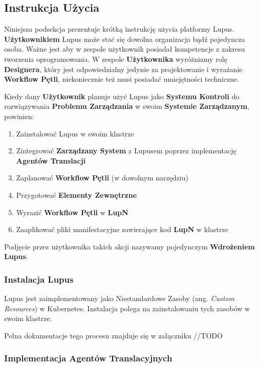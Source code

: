 \subsection{Instrukcja Użycia}

Niniejsza podsekcja prezentuje krótką instrukcję użycia platformy Lupus. \textbf{Użytkownikiem} Lupus może stać się dowolna organizacja bądź pojedyncza osoba. Ważne jest aby w zespole użytkownik posiadał kompetencje z zakresu tworzenia oprogramowania. W zespole \textbf{Użytkownika} wyróżniamy rolę \textbf{Designera}, który jest odpowiedzialny jedynie za projektowanie i wyrażanie \textbf{Workflow Pętli}, niekoniecznie też musi posiadać umiejętności techniczne. 

Kiedy dany \textbf{Użytkownik} planuje użyć Lupus jako \textbf{Systemu Kontroli} do rozwiązywania \textbf{Problemu Zarządzania} w swoim \textbf{Systemie Zarządzanym}, powinien:
\begin{enumerate}
    \item Zainstalować Lupus w swoim klastrze
    \item Zintegrować \textbf{Zarządzany System} z Lupusem poprzez implementację \textbf{Agentów Translacji}
    \item Zaplanować \textbf{Workflow Pętli} (w dowolnym narzędziu)
    \item Przygotować \textbf{Elementy Zewnętrzne} 
    \item Wyrazić \textbf{Workflow Pętli} w \textbf{LupN} 
    \item Zaaplikować pliki manifestacyjne zawierające kod \textbf{LupN} w klastrze
\end{enumerate}

Podjęcie przez użytkownika takich akcji nazywamy pojedynczym \textbf{Wdrożeniem Lupus}.

\subsubsection{Instalacja Lupus}

Lupus jest zaimplementowany jako Niestandardowe Zasoby (ang. \textit{Custom Resources}) w Kubernetes. Instalacja polega na zainstalowaniu tych zasobów w swoim klastrze. 

Pełna dokumentacje tego procesu znajduje się w załączniku //TODO

\subsubsection{Implementacja Agentów Translacyjnych}

